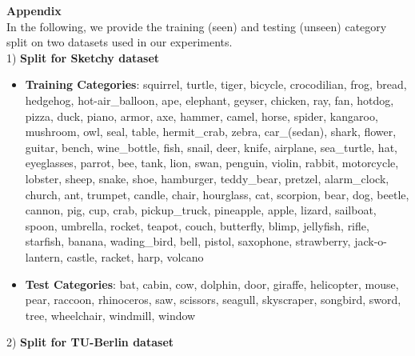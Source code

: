 \documentclass[10pt,twocolumn,letterpaper]{article}
\begin{document}
{\small


}

\clearpage

\Large\textbf{Appendix} \normalsize \\

In the following, we provide the training (seen) and testing (unseen) category split on two datasets used in our experiments. \\

\large1) \textbf{Split for Sketchy dataset} \normalsize

\begin{itemize}
    \item \textbf{Training Categories}: squirrel, turtle, tiger, bicycle, crocodilian, frog, bread, hedgehog, hot-air\_balloon, ape, elephant, geyser, chicken, ray, fan, hotdog, pizza, duck, piano, armor, axe, hammer, camel, horse, spider, kangaroo, mushroom, owl, seal, table, hermit\_crab, zebra, car\_(sedan), shark, flower, guitar, bench, wine\_bottle, fish, snail, deer, knife, airplane, sea\_turtle, hat, eyeglasses, parrot, bee, tank, lion, swan, penguin, violin, rabbit, motorcycle, lobster, sheep, snake, shoe, hamburger, teddy\_bear, pretzel, alarm\_clock, church, ant, trumpet, candle, chair, hourglass, cat, scorpion, bear, dog, beetle, cannon, pig, cup, crab, pickup\_truck, pineapple, apple, lizard, sailboat, spoon, umbrella, rocket, teapot, couch, butterfly, blimp, jellyfish, rifle, starfish, banana, wading\_bird, bell, pistol, saxophone, strawberry, jack-o-lantern, castle, racket, harp, volcano
    \item \textbf{Test Categories}: bat, cabin, cow, dolphin, door, giraffe, helicopter, mouse, pear, raccoon, rhinoceros, saw, scissors, seagull, skyscraper, songbird, sword, tree, wheelchair, windmill, window
\end{itemize}

\large2) \textbf{Split for TU-Berlin dataset} \normalsize
\end{document}
